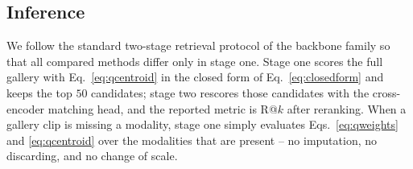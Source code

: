 \subsection{Inference}

We follow the standard two-stage retrieval protocol of the backbone family so that
all compared methods differ only in stage one. Stage one scores the full gallery with
Eq.~\eqref{eq:qcentroid} in the closed form of Eq.~\eqref{eq:closedform} and keeps the
top $50$ candidates; stage two rescores those candidates with the cross-encoder
matching head, and the reported metric is R@$k$ after reranking. When a gallery clip
is missing a modality, stage one simply evaluates Eqs.~\eqref{eq:qweights} and
\eqref{eq:qcentroid} over the modalities that are present -- no imputation, no
discarding, and no change of scale.
